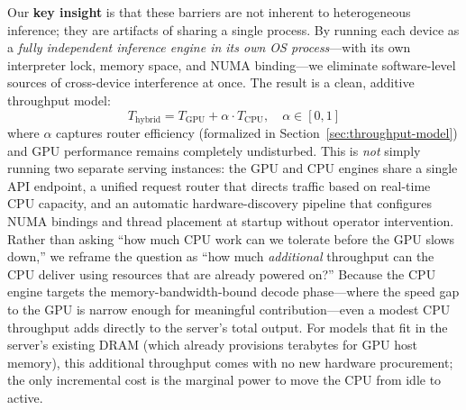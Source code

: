 \documentclass[10pt,conference]{IEEEtran}
\begin{document}
Our \textbf{key insight} is that these barriers are not inherent to heterogeneous inference; they are artifacts of sharing a single process.
By running each device as a \emph{fully independent inference engine in its own OS process}---with its own interpreter lock, memory space, and NUMA binding---we eliminate software-level sources of cross-device interference at once.
The result is a clean, additive throughput model:
\[
T_\text{hybrid} = T_\text{GPU} + \alpha \cdot T_\text{CPU}, \quad \alpha \in [0, 1]
\]
where $\alpha$ captures router efficiency (formalized in Section~\ref{sec:throughput-model}) and GPU performance remains completely undisturbed.
This is \emph{not} simply running two separate serving instances: the GPU and CPU engines share a single API endpoint, a unified request router that directs traffic based on real-time CPU capacity, and an automatic hardware-discovery pipeline that configures NUMA bindings and thread placement at startup without operator intervention.
Rather than asking ``how much CPU work can we tolerate before the GPU slows down,'' we reframe the question as ``how much \emph{additional} throughput can the CPU deliver using resources that are already powered on?''
Because the CPU engine targets the memory-bandwidth-bound decode phase---where the speed gap to the GPU is narrow enough for meaningful contribution---even a modest CPU throughput adds directly to the server's total output.
For models that fit in the server's existing DRAM (which already provisions terabytes for GPU host memory), this additional throughput comes with no new hardware procurement; the only incremental cost is the marginal power to move the CPU from idle to active.
\end{document}
